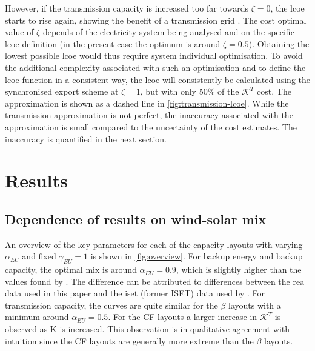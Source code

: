 \documentclass[a4paper, 5p, sort&compress]{elsarticle}%
\begin{document}
However, if the transmission capacity is increased too far towards
$\zeta=0$, the \gls{lcoe} starts to rise again, showing the benefit of a transmission grid
\cite{Rodriguez2013}.
The cost optimal value of $\zeta$
depends of the electricity system being analysed and on the specific \gls{lcoe} definition (in
the present case the optimum is around $\zeta= 0.5$).
Obtaining the lowest possible \gls{lcoe} would thus require system individual optimisation. To
avoid the additional complexity associated with such an optimisation and to define the
\gls{lcoe} function in a consistent way, the \gls{lcoe} will consistently be calculated using
the synchronised export scheme at $\zeta=1$,
but with only 50\% of the $\mathcal{K}^{T}$
cost. The approximation is shown as a dashed line in \cref{fig:transmission-lcoe}. While the
transmission approximation is not perfect, the inaccuracy associated with the approximation is small
compared to the uncertainty of the cost estimates. The inaccuracy is quantified in the next section.

\section{Results}
\label{sec:results}

\subsection{Dependence of results on wind-solar mix}

An overview of the key parameters for each of the capacity layouts
with varying $\alpha_{EU}$ and fixed $\gamma_{EU} = 1 $
is shown in \cref{fig:overview}. For
backup energy and backup capacity, the optimal mix is around
$\alpha_{EU} = 0.9$, which is slightly higher than the values found by
\cite{Heide2010,Heide2011}.
The difference can be attributed to differences between the \gls{rea} data used in this paper
and the \gls{iset} (former ISET) data \cite{iset} used by \cite{Heide2010,Heide2011}. For
transmission capacity, the curves are quite similar for the $\beta$
layouts with a minimum around $\alpha_{EU} = 0.5$.
For the CF layouts a larger increase in $\mathcal{K}^{T}$
is observed as K is increased. This observation is in qualitative agreement with intuition
since the CF layouts are generally more extreme than the $\beta$
layouts. %
\end{document}
